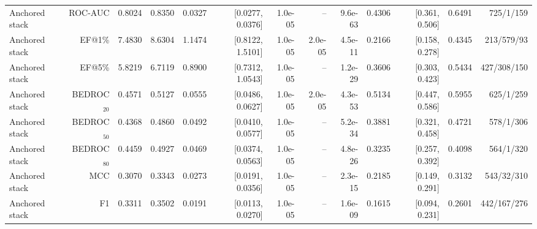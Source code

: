 \begin{table}[t]
\begin{tabular}{lrrrrrrrrrrrr}
Anchored stack & ROC-AUC & 0.8024 & 0.8350 & 0.0327 & [0.0277, 0.0376] & 1.0e-05 & -- & 9.6e-63 & 0.4306 & [0.361, 0.506] & 0.6491 & 725/1/159 \\
Anchored stack & EF@1\% & 7.4830 & 8.6304 & 1.1474 & [0.8122, 1.5101] & 1.0e-05 & 2.0e-05 & 4.5e-11 & 0.2166 & [0.158, 0.278] & 0.4345 & 213/579/93 \\
Anchored stack & EF@5\% & 5.8219 & 6.7119 & 0.8900 & [0.7312, 1.0543] & 1.0e-05 & -- & 1.2e-29 & 0.3606 & [0.303, 0.423] & 0.5434 & 427/308/150 \\
Anchored stack & BEDROC$_{20}$ & 0.4571 & 0.5127 & 0.0555 & [0.0486, 0.0627] & 1.0e-05 & 2.0e-05 & 4.3e-53 & 0.5134 & [0.447, 0.586] & 0.5955 & 625/1/259 \\
Anchored stack & BEDROC$_{50}$ & 0.4368 & 0.4860 & 0.0492 & [0.0410, 0.0577] & 1.0e-05 & -- & 5.2e-34 & 0.3881 & [0.321, 0.458] & 0.4721 & 578/1/306 \\
Anchored stack & BEDROC$_{80}$ & 0.4459 & 0.4927 & 0.0469 & [0.0374, 0.0563] & 1.0e-05 & -- & 4.8e-26 & 0.3235 & [0.257, 0.392] & 0.4098 & 564/1/320 \\
Anchored stack & MCC & 0.3070 & 0.3343 & 0.0273 & [0.0191, 0.0356] & 1.0e-05 & -- & 2.3e-15 & 0.2185 & [0.149, 0.291] & 0.3132 & 543/32/310 \\
Anchored stack & F1 & 0.3311 & 0.3502 & 0.0191 & [0.0113, 0.0270] & 1.0e-05 & -- & 1.6e-09 & 0.1615 & [0.094, 0.231] & 0.2601 & 442/167/276 \\
\bottomrule
\end{tabular}
\end{table}
